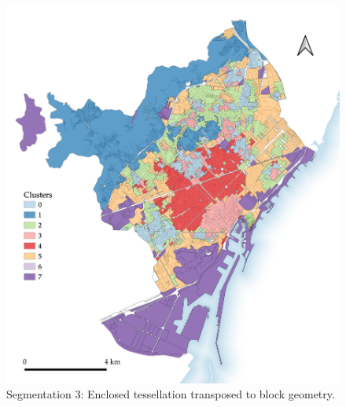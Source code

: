 \documentclass[a4paper, nobind]{templates/ociamthesis}
\begin{document}
\begin{figure}

{\centering \includegraphics[width=.8\paperwidth]{figures/maps/block_8cls_5sw 2} 

}

\caption[Segmentation 3: ET transposed to block.]{Segmentation 3: Enclosed tessellation transposed to block geometry.}\label{fig:ET-block-map-BCN}
\end{figure}
\end{document}
